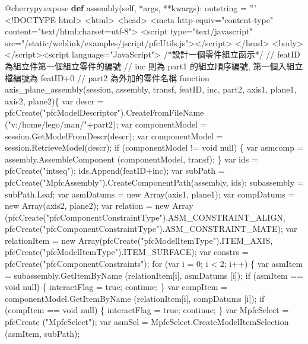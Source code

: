 \documentclass[]{article}
\newenvironment{Shaded}{}{}
\newcommand{\KeywordTok}[1]{\textcolor[rgb]{0.00,0.44,0.13}{\textbf{{#1}}}}
\newcommand{\StringTok}[1]{\textcolor[rgb]{0.25,0.44,0.63}{{#1}}}
\newcommand{\OtherTok}[1]{\textcolor[rgb]{0.00,0.44,0.13}{{#1}}}
\newcommand{\NormalTok}[1]{{#1}}
\begin{document}
\begin{Shaded}
\begin{Highlighting}[]
    \OtherTok{@cherrypy.expose}
    \KeywordTok{def} \NormalTok{assembly(}\OtherTok{self}\NormalTok{, *args, **kwargs):}
        \NormalTok{outstring = }\StringTok{'''}
\StringTok{<!DOCTYPE html> }
\StringTok{<html>}
\StringTok{<head>}
\StringTok{<meta http-equiv="content-type" content="text/html;charset=utf-8">}
\StringTok{<script type="text/javascript" src="/static/weblink/examples/jscript/pfcUtils.js"></script>}
\StringTok{</head>}
\StringTok{<body>}
\StringTok{</script><script language="JavaScript">}
\StringTok{/*設計一個零件組立函示*/}
\StringTok{// featID 為組立件第一個組立零件的編號}
\StringTok{// inc 則為 part1 的組立順序編號, 第一個入組立檔編號為 featID+0}
\StringTok{// part2 為外加的零件名稱}
\StringTok{function axis_plane_assembly(session, assembly, transf, featID, inc, part2, axis1, plane1, axis2, plane2)\{}
\StringTok{var descr = pfcCreate("pfcModelDescriptor").CreateFromFileName ("v:/home/lego/man/"+part2);}
\StringTok{var componentModel = session.GetModelFromDescr(descr);}
\StringTok{var componentModel = session.RetrieveModel(descr);}
\StringTok{if (componentModel != void null)}
\StringTok{\{}
\StringTok{    var asmcomp = assembly.AssembleComponent (componentModel, transf);}
\StringTok{\}}
\StringTok{var ids = pfcCreate("intseq");}
\StringTok{ids.Append(featID+inc);}
\StringTok{var subPath = pfcCreate("MpfcAssembly").CreateComponentPath(assembly, ids);}
\StringTok{subassembly = subPath.Leaf;}
\StringTok{var asmDatums = new Array(axis1, plane1);}
\StringTok{var compDatums = new Array(axis2, plane2);}
\StringTok{var relation = new Array (pfcCreate("pfcComponentConstraintType").ASM_CONSTRAINT_ALIGN, pfcCreate("pfcComponentConstraintType").ASM_CONSTRAINT_MATE);}
\StringTok{var relationItem = new Array(pfcCreate("pfcModelItemType").ITEM_AXIS, pfcCreate("pfcModelItemType").ITEM_SURFACE);}
\StringTok{var constrs = pfcCreate("pfcComponentConstraints");}
\StringTok{    for (var i = 0; i < 2; i++)}
\StringTok{    \{}
\StringTok{        var asmItem = subassembly.GetItemByName (relationItem[i], asmDatums [i]);}
\StringTok{        if (asmItem == void null)}
\StringTok{        \{}
\StringTok{            interactFlag = true;}
\StringTok{            continue;}
\StringTok{        \}}
\StringTok{        var compItem = componentModel.GetItemByName (relationItem[i], compDatums [i]);}
\StringTok{        if (compItem == void null)}
\StringTok{        \{}
\StringTok{            interactFlag = true;}
\StringTok{            continue;}
\StringTok{        \}}
\StringTok{        var MpfcSelect = pfcCreate ("MpfcSelect");}
\StringTok{        var asmSel = MpfcSelect.CreateModelItemSelection (asmItem, subPath);}

\end{Highlighting}
\end{Shaded}
\end{document}
